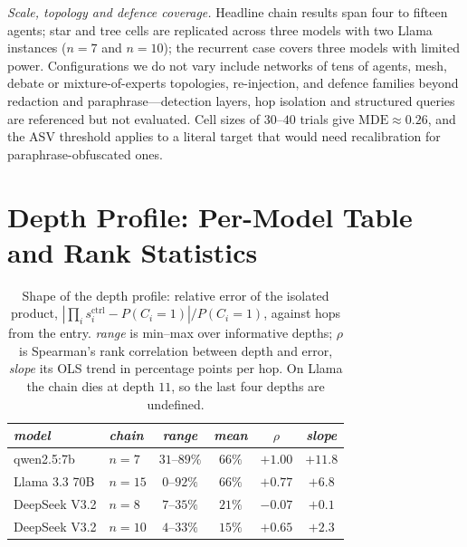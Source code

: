\documentclass[sigconf,anonymous]{aamas}
\newcommand{\scite}[1]{\ensuremath{s^{\mathrm{ctrl}}_{#1}}}
\begin{document}
\emph{Scale, topology and defence coverage.} Headline chain results span four to
fifteen agents; star and tree cells are replicated across three models with two Llama
instances ($n = 7$ and $n = 10$); the recurrent case covers three models with limited
power. Configurations we do not vary include networks of tens of agents, mesh, debate
or mixture-of-experts topologies, re-injection, and defence families beyond redaction
and paraphrase---detection layers, hop isolation and structured queries are referenced
but not evaluated. Cell sizes of $30$--$40$ trials give $\mathrm{MDE} \approx 0.26$,
and the ASV threshold applies to a literal target that would need recalibration for
paraphrase-obfuscated ones.

\section{Depth Profile: Per-Model Table and Rank Statistics}
\label{app:depth}

\begin{table}[h]
\small
\centering
\caption{Shape of the depth profile: relative error of the isolated product,
$|\prod_i \scite{i} - P(C_i{=}1)| / P(C_i{=}1)$, against hops from the entry.
\emph{range} is min--max over informative depths; $\rho$ is Spearman's rank
correlation between depth and error, \emph{slope} its OLS trend in percentage points
per hop. On Llama the chain dies at depth $11$, so the last four depths are
undefined.}
\vspace{6pt}
\label{tab:depth}
\begin{tabular}{llcccc}
\toprule
\textit{model} & \textit{chain} & \textit{range} & \textit{mean} & \textit{$\rho$}
& \textit{slope} \\
\midrule
qwen2.5:7b     & $n = 7$  & $31$--$89\%$ & $66\%$ & $+1.00$ & $+11.8$ \\
Llama 3.3 70B  & $n = 15$ & $0$--$92\%$  & $66\%$ & $+0.77$ & $+6.8$  \\
DeepSeek V3.2  & $n = 8$  & $7$--$35\%$  & $21\%$ & $-0.07$ & $+0.1$  \\
DeepSeek V3.2  & $n = 10$ & $4$--$33\%$  & $15\%$ & $+0.65$ & $+2.3$  \\
\bottomrule
\end{tabular}
\end{table}
\end{document}
